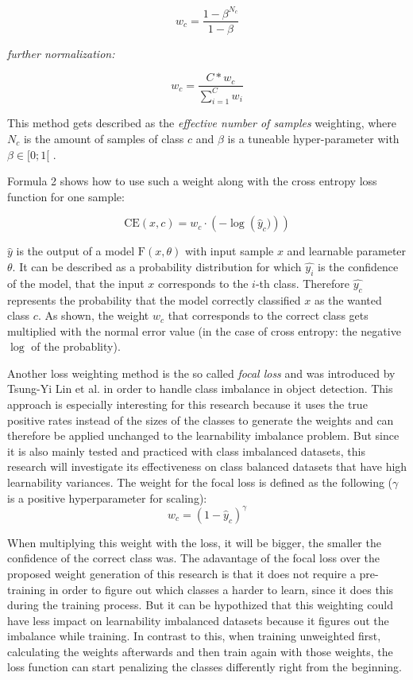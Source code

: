 \documentclass[journal]{IEEEtran}
\begin{document}
\[ w_c = \frac{1-\beta^{N_c}}{1-\beta} \]

\emph{further normalization:}

\[ w_c = \frac{C * w_c}{\sum_{i=1}^{C}w_i} \]

This method gets described as the \emph{effective number of samples} weighting, where $N_c$ is the amount of samples of class $c$ and $\beta$ is a tuneable hyper-parameter with $\beta \in [0;1[$ .

Formula 2 shows how to use such a weight along with the cross entropy loss function for one sample:

\[ \text{CE}(x, c) = w_{c} \cdot \left(-\log\left(\hat{y}_c)\right) \right) \]

$\hat{y}$ is the output of a model $\text{F}(x, \theta)$ with input sample $x$ and learnable parameter $\theta$. 
It can be described as a probability distribution for which $\hat{y_i}$ is the confidence of the model, that the input $x$ corresponds to the $i$-th class.
Therefore $\hat{y_c}$ represents the probability that the model correctly classified $x$ as the wanted class $c$. 
As shown, the weight $w_c$ that corresponds to the correct class gets multiplied with the normal error value (in the case of cross entropy: the negative $\log$ of the probablity).

Another loss weighting method is the so called \emph{focal loss} and was introduced by Tsung-Yi Lin et al. \cite{lin2017focal} in order to handle class imbalance in object detection.
This approach is especially interesting for this research because it uses the true positive rates instead of the sizes of the classes to generate the weights and can therefore be applied unchanged to the learnability imbalance problem.
But since it is also mainly tested and practiced with class imbalanced datasets, this research will investigate its effectiveness on class balanced datasets that have high learnability variances.
The weight for the focal loss is defined as the following ($\gamma$ is a positive hyperparameter for scaling):
\[ w_c = (1 - \hat{y}_c)^\gamma \]

When multiplying this weight with the loss, it will be bigger, the smaller the confidence of the correct class was. 
The adavantage of the focal loss over the proposed weight generation of this research is that it does not require a pre-training in order to figure out which classes a harder to learn, since it does this during the training process.
But it can be hypothized that this weighting could have less impact on learnability imbalanced datasets because it figures out the imbalance while training.
In contrast to this, when training unweighted first, calculating the weights afterwards and then train again with those weights, the loss function can start penalizing the classes differently right from the beginning.
\end{document}
